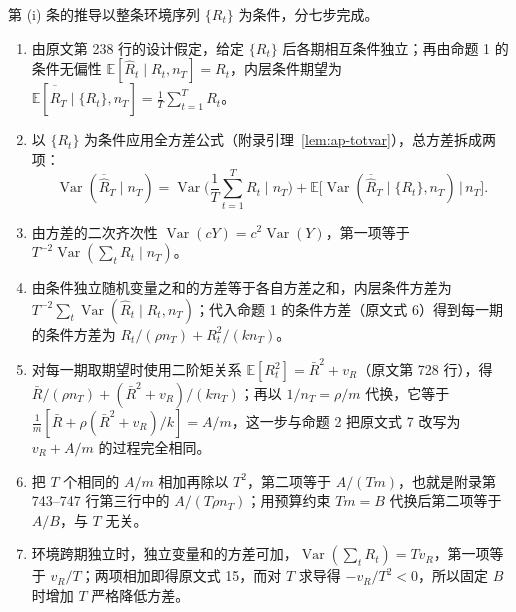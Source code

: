 第 (i) 条的推导以整条环境序列 $\{R_t\}$ 为条件，分七步完成。
\begin{enumerate}
\item 由原文第 238 行的设计假定，给定 $\{R_t\}$ 后各期相互条件独立；再由命题 1 的条件无偏性 $\mathbb E[\widehat R_t\mid R_t,n_T]=R_t$，内层条件期望为 $\mathbb E[\overline{\widehat R}_T\mid\{R_t\},n_T]=\frac1T\sum_{t=1}^TR_t$。
\item 以 $\{R_t\}$ 为条件应用全方差公式（附录引理~\ref{lem:ap-totvar}），总方差拆成两项：
\begin{equation*}
\operatorname{Var}(\overline{\widehat R}_T\mid n_T)=\operatorname{Var}\Big(\frac1T\sum_{t=1}^TR_t\;\Big|\;n_T\Big)+\mathbb E\big[\operatorname{Var}(\overline{\widehat R}_T\mid\{R_t\},n_T)\,\big|\,n_T\big].
\end{equation*}
\item 由方差的二次齐次性 $\operatorname{Var}(cY)=c^2\operatorname{Var}(Y)$，第一项等于 $T^{-2}\operatorname{Var}(\sum_tR_t\mid n_T)$。
\item 由条件独立随机变量之和的方差等于各自方差之和，内层条件方差为 $T^{-2}\sum_t\operatorname{Var}(\widehat R_t\mid R_t,n_T)$；代入命题 1 的条件方差（原文式 6）得到每一期的条件方差为 $R_t/(\rho n_T)+R_t^2/(kn_T)$。
\item 对每一期取期望时使用二阶矩关系 $\mathbb E[R_t^2]=\bar R^2+v_R$（原文第 728 行），得 $\bar R/(\rho n_T)+(\bar R^2+v_R)/(kn_T)$；再以 $1/n_T=\rho/m$ 代换，它等于 $\frac1m[\bar R+\rho(\bar R^2+v_R)/k]=A/m$，这一步与命题 2 把原文式 7 改写为 $v_R+A/m$ 的过程完全相同。
\item 把 $T$ 个相同的 $A/m$ 相加再除以 $T^2$，第二项等于 $A/(Tm)$，也就是附录第 743–747 行第三行中的 $A/(T\rho n_T)$；用预算约束 $Tm=B$ 代换后第二项等于 $A/B$，与 $T$ 无关。
\item 环境跨期独立时，独立变量和的方差可加，$\operatorname{Var}(\sum_tR_t)=Tv_R$，第一项等于 $v_R/T$；两项相加即得原文式 15，而对 $T$ 求导得 $-v_R/T^2<0$，所以固定 $B$ 时增加 $T$ 严格降低方差。
\end{enumerate}


